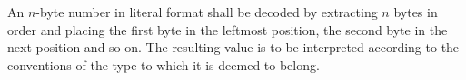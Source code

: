 An $n$-byte number in literal format shall be decoded by extracting $n$
bytes in order and placing the first byte in the leftmost position, the
second byte in the next position and so on. The resulting value is to be
interpreted according to the conventions of the type to which it is
deemed to belong.
